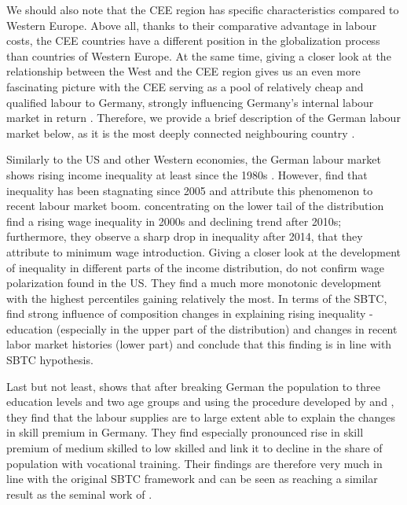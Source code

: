 \documentclass[11pt]{article}
\begin{document}
We should also note that the CEE region has specific characteristics compared to Western Europe. Above all, thanks to their comparative advantage in labour costs, the CEE countries have a different position in the globalization process than countries of Western Europe. At the same time, giving a closer look at the relationship between the West and the CEE region gives us an even more fascinating picture with the CEE serving as a pool of relatively cheap and qualified labour to Germany, strongly influencing Germany's internal labour market in return \citep{marin2004nation, marin2018global}. Therefore, we provide a brief description of the German labour market below, as it is the most deeply connected neighbouring country \citep{baldwin2015supply}.

Similarly to the US and other Western economies, the German labour market shows rising income inequality at least since the 1980s \citep{biewen2017rising}. However, \citet{biewen2021labour} find that inequality has been stagnating since 2005 and attribute this phenomenon to recent labour market boom. \citet{bossler2020wage} concentrating on the lower tail of the distribution find a rising wage inequality in 2000s and declining trend after 2010s; furthermore, they observe a sharp drop in inequality after 2014, that they attribute to minimum wage introduction.
Giving a closer look at the development of inequality in different parts of the income distribution, \citet{biewen2019unions} do not confirm wage polarization found in the US. They find a much more monotonic development with the highest percentiles gaining relatively the most.
In terms of the SBTC, \citet{biewen2017rising} find strong influence of composition changes in explaining rising inequality - education (especially in the upper part of the distribution) and changes in recent labor market histories (lower part) and conclude that this finding is in line with SBTC hypothesis.

Last but not least, \citet{glitz2021skill} shows that after breaking German the population to three education levels and two age groups and using the procedure developed by \citet{katz1992changes} and \citet{card2001can}, they find that the labour supplies are to large extent able to explain the changes in skill premium in Germany. They find especially pronounced rise in skill premium of medium skilled to low skilled and link it to decline in the share of population with vocational training. Their findings are therefore very much in line with the original SBTC framework and can be seen as reaching a similar result as the seminal work of \citet{goldin2010race}.
\end{document}
